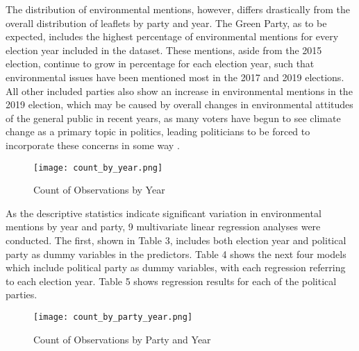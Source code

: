 \documentclass[12pt,letterpaper]{article}
\begin{document}
The distribution of environmental mentions, however, differs drastically from the overall distribution of leaflets by party and year. The Green Party, as to be expected, includes the highest percentage of environmental mentions for every election year included in the dataset. These mentions, aside from the 2015 election, continue to grow in percentage for each election year, such that environmental issues have been mentioned most in the 2017 and 2019 elections. All other included parties also show an increase in environmental mentions in the 2019 election, which may be caused by overall changes in environmental attitudes of the general public in recent years, as many voters have begun to see climate change as a primary topic in politics, leading politicians to be forced to incorporate these concerns in some way \autocite{burnsWillBrexitDegrade2020}.











\begin{figure}[H]  %
	\centering
	\texttt{[image: count\_by\_year.png]} %
	\caption{Count of Observations by Year}
	\label{fig:count_by_year}
\end{figure}


As the descriptive statistics indicate significant variation in environmental mentions by year and party, 9 multivariate linear regression analyses were conducted. The first, shown in Table 3, includes both election year and political party as dummy variables in the predictors. Table 4 shows the next four models which include political party as dummy variables, with each regression referring to each election year. Table 5 shows regression results for each of the political parties.



\begin{figure}[H]
	\centering
	\texttt{[image: count\_by\_party\_year.png]} %
	\caption{Count of Observations by Party and Year}
	\label{fig:count_by_party_year}
\end{figure}
\end{document}
